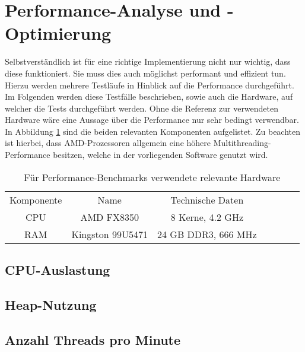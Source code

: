 \section{Performance-Analyse und -Optimierung}
Selbstverständlich ist für eine richtige Implementierung nicht nur wichtig, dass diese funktioniert. Sie muss dies auch möglichst performant und effizient tun. Hierzu werden mehrere Testläufe in Hinblick auf die Performance durchgeführt. Im Folgenden werden diese Testfälle beschrieben, sowie auch die Hardware, auf welcher die Tests durchgeführt werden. Ohne die Referenz zur verwendeten Hardware wäre eine Aussage über die Performance nur sehr bedingt verwendbar. In Abbildung \ref{hardware} sind die beiden relevanten Komponenten aufgelistet. Zu beachten ist hierbei, dass AMD-Prozessoren allgemein eine höhere Multithreading-Performance besitzen, welche in der vorliegenden Software genutzt wird.

\begin{table}
	\centering
	\begin{tabular}{c c c c c c c}
		Komponente & Name & Technische Daten\\
		CPU & AMD FX8350 & 8 Kerne, 4.2 GHz\\ 
		RAM & Kingston 99U5471 & 24 GB DDR3, 666 MHz  \\ 
	\end{tabular}
	\caption{Für Performance-Benchmarks verwendete relevante Hardware}
	\label{hardware}
\end{table}

\subsection{CPU-Auslastung}

\subsection{Heap-Nutzung}

\subsection{Anzahl Threads pro Minute}